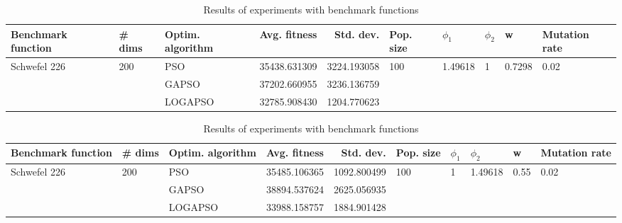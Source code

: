 \documentclass{article}
\begin{document}
\begin{table}
\centering
\caption{Results of experiments with benchmark functions}
\begin{tabular}{lllrrlllll}
\toprule
           Benchmark function &              \# dims & Optim. algorithm &  Avg. fitness &   Std. dev. &            Pop. size &               $\phi_{1}$ &         $\phi_{2}$ &                       w &         Mutation rate \\
\midrule
\multirow{3}{*}{Schwefel 226} & \multirow{3}{*}{200} &              PSO &  35438.631309 & 3224.193058 & \multirow{3}{*}{100} & \multirow{3}{*}{1.49618} & \multirow{3}{*}{1} & \multirow{3}{*}{0.7298} & \multirow{3}{*}{0.02} \\
                              &                      &            GAPSO &  37202.660955 & 3236.136759 &                      &                          &                    &                         &                       \\
                              &                      &          LOGAPSO &  32785.908430 & 1204.770623 &                      &                          &                    &                         &                       \\
\bottomrule
\end{tabular}
\end{table}
\begin{table}
\centering
\caption{Results of experiments with benchmark functions}
\begin{tabular}{lllrrlllll}
\toprule
           Benchmark function &              \# dims & Optim. algorithm &  Avg. fitness &   Std. dev. &            Pop. size &         $\phi_{1}$ &               $\phi_{2}$ &                     w &         Mutation rate \\
\midrule
\multirow{3}{*}{Schwefel 226} & \multirow{3}{*}{200} &              PSO &  35485.106365 & 1092.800499 & \multirow{3}{*}{100} & \multirow{3}{*}{1} & \multirow{3}{*}{1.49618} & \multirow{3}{*}{0.55} & \multirow{3}{*}{0.02} \\
                              &                      &            GAPSO &  38894.537624 & 2625.056935 &                      &                    &                          &                       &                       \\
                              &                      &          LOGAPSO &  33988.158757 & 1884.901428 &                      &                    &                          &                       &                       \\
\bottomrule
\end{tabular}
\end{table}
\end{document}
